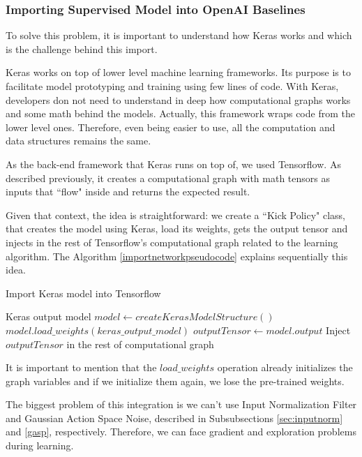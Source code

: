 \subsubsection{Importing Supervised Model into OpenAI Baselines}

To solve this problem, it is important to understand how Keras works and which is the challenge behind this import. 

Keras works on top of lower level machine learning frameworks. Its purpose is to facilitate model prototyping and training using few lines of code. With Keras, developers don not need to understand in deep how computational graphs works and some math behind the models. Actually, this framework wraps code from the lower level ones. Therefore, even being easier to use, all the computation and data structures remains the same.

As the back-end framework that Keras runs on top of, we used Tensorflow. As described previously, it creates a computational graph with math tensors as inputs that ``flow" inside and returns the expected result.

Given that context, the idea is straightforward: we create a     ``Kick Policy" class, that creates the model using Keras, load its weights, gets the output tensor and injects in the rest of Tensorflow's computational graph related to the learning algorithm. The Algorithm \ref{importnetworkpseudocode} explains sequentially this idea.

\begin{algorithm}
	\caption{Import Keras model into Tensorflow}
	\begin{algorithmic} 
		\REQUIRE Keras output model
		\STATE $model \leftarrow createKerasModelStructure()$
		\STATE $model.load\_weights(keras\_output\_model)$
		\STATE $outputTensor \leftarrow model.output$
		\STATE Inject $outputTensor$ in the rest of computational graph
	\end{algorithmic}
	\label{importnetworkpseudocode}
\end{algorithm}

It is important to mention that the $load\_weights$ operation already initializes the graph variables and if we initialize them again, we lose the pre-trained weights.

The biggest problem of this integration is we can't use Input Normalization Filter and Gaussian Action Space Noise, described in Subsubsections \ref{sec:inputnorm} and \ref{gasp}, respectively. Therefore, we can face gradient and exploration problems during learning.

